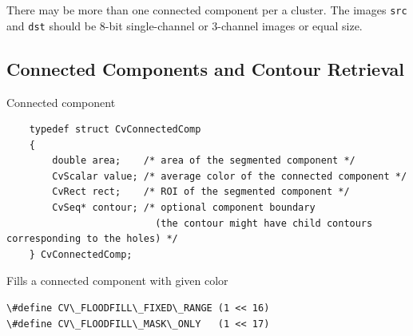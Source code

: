There may be more than one connected component per a cluster. The images \texttt{src} and \texttt{dst} should be 8-bit single-channel or 3-channel images or equal size.

\subsection{Connected Components and Contour Retrieval}

\label{CvConnectedComp}

Connected component

\begin{lstlisting}
    typedef struct CvConnectedComp
    {
        double area;    /* area of the segmented component */
        CvScalar value; /* average color of the connected component */
        CvRect rect;    /* ROI of the segmented component */
        CvSeq* contour; /* optional component boundary
                          (the contour might have child contours corresponding to the holes) */
    } CvConnectedComp;

\end{lstlisting}

\label{FloodFill}

Fills a connected component with given color


\begin{lstlisting}
\#define CV\_FLOODFILL\_FIXED\_RANGE (1 << 16)
\#define CV\_FLOODFILL\_MASK\_ONLY   (1 << 17)
\end{lstlisting}

